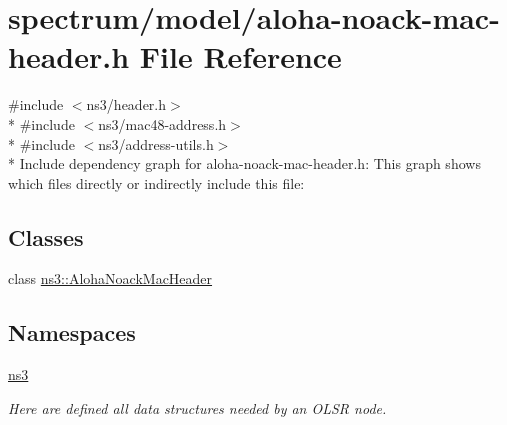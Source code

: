 \hypertarget{aloha-noack-mac-header_8h}{}\section{spectrum/model/aloha-\/noack-\/mac-\/header.h File Reference}
\label{aloha-noack-mac-header_8h}
{\ttfamily \#include $<$ns3/header.\+h$>$}\\*
{\ttfamily \#include $<$ns3/mac48-\/address.\+h$>$}\\*
{\ttfamily \#include $<$ns3/address-\/utils.\+h$>$}\\*
Include dependency graph for aloha-\/noack-\/mac-\/header.h\+:
This graph shows which files directly or indirectly include this file\+:
\subsection*{Classes}
\begin{DoxyCompactItemize}
\item 
class \hyperlink{classns3_1_1AlohaNoackMacHeader}{ns3\+::\+Aloha\+Noack\+Mac\+Header}
\end{DoxyCompactItemize}
\subsection*{Namespaces}
\begin{DoxyCompactItemize}
\item 
 \hyperlink{namespacens3}{ns3}
\begin{DoxyCompactList}\small\item\em Here are defined all data structures needed by an O\+L\+SR node. \end{DoxyCompactList}\end{DoxyCompactItemize}
